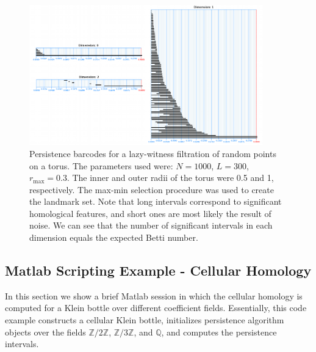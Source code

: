 \begin{figure}
\centering
\includegraphics[width=0.9\textwidth]{Adams_Henry/images/barcodes_small.png}
\caption{Persistence barcodes for a lazy-witness filtration of random points on a torus. The parameters used were: $N = 1000$, $L = 300$, $r_{\max} = 0.3$. The inner and outer radii of the torus were 0.5 and 1, respectively. The max-min selection procedure was used to create the landmark set. Note that long intervals correspond to significant homological features, and short ones are most likely the result of noise. We can see that the number of significant intervals in each dimension equals the expected Betti number.} \label{lwtorusbarcodes}
\end{figure}

\subsection{Matlab Scripting Example - Cellular Homology}

In this section we show a brief Matlab session in which the cellular homology is computed for a Klein bottle over different coefficient fields. Essentially, this code example constructs a cellular Klein bottle, initializes persistence algorithm objects over the fields $\mathbb{Z}/2\mathbb{Z}$, $\mathbb{Z}/3\mathbb{Z}$, and $\mathbb{Q}$, and computes the persistence intervals.

